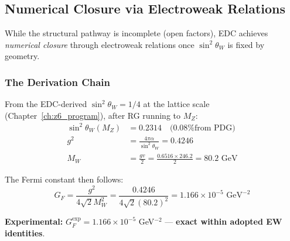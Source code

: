 \subsection{Numerical Closure via Electroweak Relations}
\label{sec:ch11_numerical}

While the structural pathway is incomplete (open factors), EDC achieves
\emph{numerical closure} through electroweak relations once $\sin^2\theta_W$ is
fixed by geometry.

\subsubsection{The Derivation Chain}

\begin{theorem}
\label{thm:ch11_GF}
From the EDC-derived $\sin^2\theta_W = 1/4$ at the lattice scale
(Chapter~\ref{ch:z6_program}), after RG running to $M_Z$:
\begin{align}
    \sin^2\theta_W(M_Z) &= 0.2314 \quad \text{(0.08\% from PDG)} \\
    g^2 &= \frac{4\pi\alpha}{\sin^2\theta_W} = 0.4246 \\
    M_W &= \frac{gv}{2} = \frac{0.6516 \times 246.2}{2} = 80.2 \text{ GeV}
\end{align}

The Fermi constant then follows:
\begin{equation}
    \boxed{
    G_F = \frac{g^2}{4\sqrt{2}M_W^2} = \frac{0.4246}{4\sqrt{2}(80.2)^2}
    = 1.166 \times 10^{-5} \text{ GeV}^{-2}
    }
    \label{eq:ch11_GF_derived}
\end{equation}

\textbf{Experimental:} $G_F^{\text{exp}} = 1.166 \times 10^{-5}$ GeV$^{-2}$
\tagBL{} --- \textbf{exact within adopted EW identities}.
\end{theorem}

